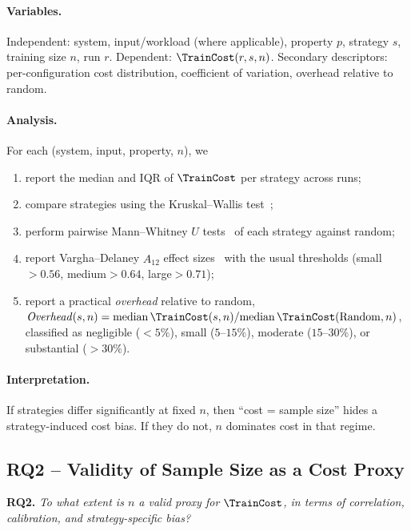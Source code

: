 \paragraph*{Variables.}
Independent: system, input/workload (where applicable), property $p$, strategy
$s$, training size $n$, run $r$. Dependent: $\TrainCost(r,s,n)$. Secondary
descriptors: per-configuration cost distribution, coefficient of variation,
overhead relative to random.

\paragraph*{Analysis.}
For each (system, input, property, $n$), we
\begin{enumerate}
    \item report the median and IQR of $\TrainCost$ per strategy across runs;
    \item compare strategies using the Kruskal--Wallis
    test~\cite{kruskal1952};
    \item perform pairwise Mann--Whitney $U$ tests~\cite{mann1947} of each
    strategy against random;
    \item report Vargha--Delaney $\hat A_{12}$ effect sizes~\cite{vargha2000}
    with the usual thresholds (small$>0.56$, medium$>0.64$, large$>0.71$);
    \item report a practical \emph{overhead} relative to random,
    $\mathit{Overhead}(s,n)=\mathrm{median}\,\TrainCost(s,n)/\mathrm{median}\,\TrainCost(\mathrm{Random},n)$,
    classified as negligible ($<5\%$), small ($5$--$15\%$), moderate
    ($15$--$30\%$), or substantial ($>30\%$).
\end{enumerate}

\paragraph*{Interpretation.}
If strategies differ significantly at fixed $n$, then ``cost = sample size''
hides a strategy-induced cost bias. If they do not, $n$ dominates cost in that
regime.

\subsection{RQ2 -- Validity of Sample Size as a Cost Proxy}
\label{subsec:rq2}

\textbf{RQ2.} \emph{To what extent is $n$ a valid proxy for $\TrainCost$, in
terms of correlation, calibration, and strategy-specific bias?}

